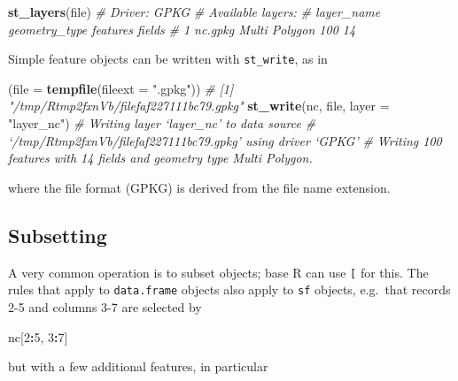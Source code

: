 \documentclass[]{book}
\newenvironment{Shaded}{\begin{snugshade}}{\end{snugshade}}
\newcommand{\CommentTok}[1]{\textcolor[rgb]{0.56,0.35,0.01}{\textit{#1}}}
\newcommand{\DataTypeTok}[1]{\textcolor[rgb]{0.13,0.29,0.53}{#1}}
\newcommand{\DecValTok}[1]{\textcolor[rgb]{0.00,0.00,0.81}{#1}}
\newcommand{\KeywordTok}[1]{\textcolor[rgb]{0.13,0.29,0.53}{\textbf{#1}}}
\newcommand{\NormalTok}[1]{#1}
\newcommand{\OperatorTok}[1]{\textcolor[rgb]{0.81,0.36,0.00}{\textbf{#1}}}
\newcommand{\StringTok}[1]{\textcolor[rgb]{0.31,0.60,0.02}{#1}}
\begin{document}
\begin{Shaded}
\begin{Highlighting}[]
\KeywordTok{st_layers}\NormalTok{(file)}
\CommentTok{# Driver: GPKG }
\CommentTok{# Available layers:}
\CommentTok{#   layer_name geometry_type features fields}
\CommentTok{# 1    nc.gpkg Multi Polygon      100     14}
\end{Highlighting}
\end{Shaded}

Simple feature objects can be written with \texttt{st\_write}, as in

\begin{Shaded}
\begin{Highlighting}[]
\NormalTok{(}\DataTypeTok{file =} \KeywordTok{tempfile}\NormalTok{(}\DataTypeTok{fileext =} \StringTok{".gpkg"}\NormalTok{))}
\CommentTok{# [1] "/tmp/Rtmp2fxnVb/filefaf227111bc79.gpkg"}
\KeywordTok{st_write}\NormalTok{(nc, file, }\DataTypeTok{layer =} \StringTok{"layer_nc"}\NormalTok{)}
\CommentTok{# Writing layer `layer_nc' to data source }
\CommentTok{#   `/tmp/Rtmp2fxnVb/filefaf227111bc79.gpkg' using driver `GPKG'}
\CommentTok{# Writing 100 features with 14 fields and geometry type Multi Polygon.}
\end{Highlighting}
\end{Shaded}

where the file format (GPKG) is derived from the file name extension.

\hypertarget{subsetting}{%
\subsection{Subsetting}\label{subsetting}}

A very common operation is to subset objects; base R can use \texttt{{[}}
for this. The rules that apply to \texttt{data.frame} objects also apply to
\texttt{sf} objects, e.g.~that records 2-5 and columns 3-7 are selected by

\begin{Shaded}
\begin{Highlighting}[]
\NormalTok{nc[}\DecValTok{2}\OperatorTok{:}\DecValTok{5}\NormalTok{, }\DecValTok{3}\OperatorTok{:}\DecValTok{7}\NormalTok{]}
\end{Highlighting}
\end{Shaded}

but with a few additional features, in particular
\end{document}

